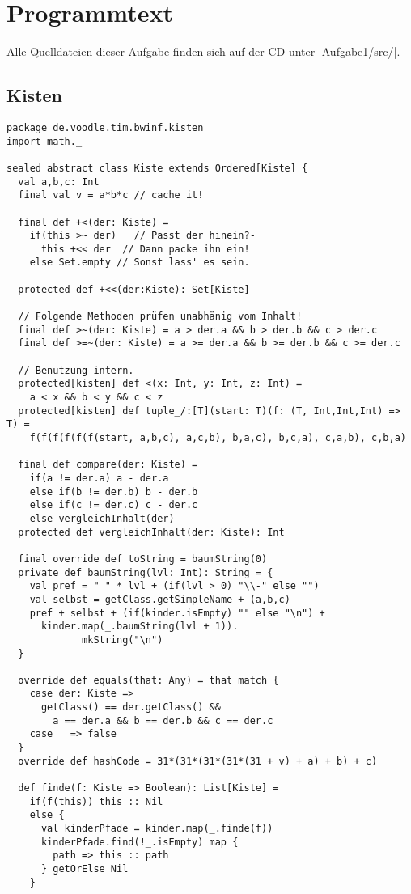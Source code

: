 \clearpage
\section{Programmtext}
\label{code1}
Alle Quelldateien dieser Aufgabe finden sich auf der CD unter |Aufgabe1/src/|.
\clearpage
\subsection{Kisten}
\begin{lstlisting}
package de.voodle.tim.bwinf.kisten
import math._

sealed abstract class Kiste extends Ordered[Kiste] {
  val a,b,c: Int
  final val v = a*b*c // cache it!

  final def +<(der: Kiste) =
    if(this >~ der)   // Passt der hinein?-
      this +<< der  // Dann packe ihn ein!
    else Set.empty // Sonst lass' es sein.

  protected def +<<(der:Kiste): Set[Kiste]

  // Folgende Methoden prüfen unabhänig vom Inhalt!
  final def >~(der: Kiste) = a > der.a && b > der.b && c > der.c
  final def >=~(der: Kiste) = a >= der.a && b >= der.b && c >= der.c

  // Benutzung intern.
  protected[kisten] def <(x: Int, y: Int, z: Int) =
    a < x && b < y && c < z
  protected[kisten] def tuple_/:[T](start: T)(f: (T, Int,Int,Int) => T) =
    f(f(f(f(f(f(start, a,b,c), a,c,b), b,a,c), b,c,a), c,a,b), c,b,a)

  final def compare(der: Kiste) =
    if(a != der.a) a - der.a
    else if(b != der.b) b - der.b
    else if(c != der.c) c - der.c
    else vergleichInhalt(der)
  protected def vergleichInhalt(der: Kiste): Int

  final override def toString = baumString(0)
  private def baumString(lvl: Int): String = {
    val pref = " " * lvl + (if(lvl > 0) "\\-" else "")
    val selbst = getClass.getSimpleName + (a,b,c)
    pref + selbst + (if(kinder.isEmpty) "" else "\n") +
      kinder.map(_.baumString(lvl + 1)).
             mkString("\n")
  }

  override def equals(that: Any) = that match {
    case der: Kiste =>
      getClass() == der.getClass() &&
        a == der.a && b == der.b && c == der.c
    case _ => false
  }
  override def hashCode = 31*(31*(31*(31*(31 + v) + a) + b) + c)

  def finde(f: Kiste => Boolean): List[Kiste] =
    if(f(this)) this :: Nil
    else {
      val kinderPfade = kinder.map(_.finde(f))
      kinderPfade.find(!_.isEmpty) map {
        path => this :: path
      } getOrElse Nil
    }


\end{lstlisting}
